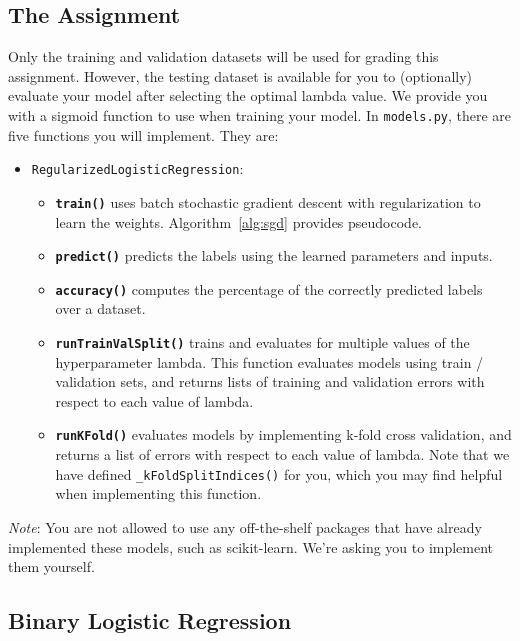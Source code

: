 \documentclass{article}
\begin{document}
\subsection*{The Assignment}
Only the training and validation datasets will be used for grading this assignment. However, the testing dataset is available for you to (optionally) evaluate your model after selecting the optimal lambda value.
We provide you with a sigmoid function to use when training your model. In \texttt{models.py}, there are five functions you will implement. They are:

\begin{itemize}
\item \texttt{RegularizedLogisticRegression}:
\begin{itemize}
	\item[\textendash] {\bf \texttt{train()}} uses batch stochastic gradient descent with regularization to learn the weights. Algorithm~\ref{alg:sgd} provides pseudocode.
	\item[\textendash] {\bf \texttt{predict()}} predicts the labels using the learned parameters and inputs.
	\item[\textendash] {\bf \texttt{accuracy()}} computes the percentage of the correctly predicted labels over a dataset.
    \item[\textendash] {\bf \texttt{runTrainValSplit()}} trains and evaluates for multiple values of the hyperparameter lambda. This function evaluates models using train / validation sets, and returns lists of training and validation errors with respect to each value of lambda.
    \item[\textendash] {\bf \texttt{runKFold()}} evaluates models by implementing k-fold cross validation, and returns a list of errors with respect to each value of lambda. Note that we have defined \texttt{\_kFoldSplitIndices()} for you, which you may find helpful when implementing this function.
\end{itemize}

\end{itemize}

\noindent\textit{Note}: You are not allowed to use any off-the-shelf packages that have already implemented these models, such as scikit-learn. We're asking you to implement them yourself.

\subsection*{Binary Logistic Regression}
\end{document}
